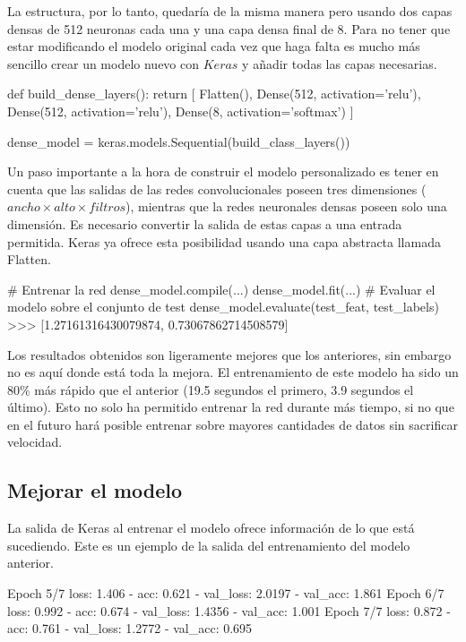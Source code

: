 La estructura, por lo tanto, quedaría de la misma manera pero usando dos capas densas de 512 neuronas cada una y una capa densa final de 8. Para no tener que estar modificando el modelo original cada vez que haga falta es mucho más sencillo crear un modelo nuevo con $Keras$ y añadir todas las capas necesarias.

\begin{python}
def build_dense_layers():
    return [
        Flatten(),
        Dense(512, activation='relu'),
        Dense(512, activation='relu'),
        Dense(8, activation='softmax')
    ]

dense_model = keras.models.Sequential(build_class_layers())
\end{python}

Un paso importante a la hora de construir el modelo personalizado es tener en cuenta que las salidas de las redes convolucionales poseen tres dimensiones ($ancho \times alto \times filtros$), mientras que la redes neuronales densas poseen solo una dimensión. Es necesario convertir la salida de estas capas a una entrada permitida. Keras ya ofrece esta posibilidad usando una capa abstracta llamada Flatten.

\begin{python}
# Entrenar la red
dense_model.compile(...)
dense_model.fit(...)
# Evaluar el modelo sobre el conjunto de test
dense_model.evaluate(test_feat, test_labels)
>>> [1.27161316430079874, 0.73067862714508579]
\end{python}

Los resultados obtenidos son ligeramente mejores que los anteriores, sin embargo no es aquí donde está toda la mejora. El entrenamiento de este modelo ha sido un 80\% más rápido que el anterior (19.5 segundos el primero, 3.9 segundos el último). Esto no solo ha permitido entrenar la red durante más tiempo, si no que en el futuro hará posible entrenar sobre mayores cantidades de datos sin sacrificar velocidad.

\subsection{Mejorar el modelo}

La salida de Keras al entrenar el modelo ofrece información de lo que está sucediendo. Este es un ejemplo de la salida del entrenamiento del modelo anterior.

\begin{python}
Epoch 5/7
loss: 1.406 - acc: 0.621 - val_loss: 2.0197 - val_acc: 1.861
Epoch 6/7
loss: 0.992 - acc: 0.674 - val_loss: 1.4356 - val_acc: 1.001
Epoch 7/7
loss: 0.872 - acc: 0.761 - val_loss: 1.2772 - val_acc: 0.695
\end{python}


